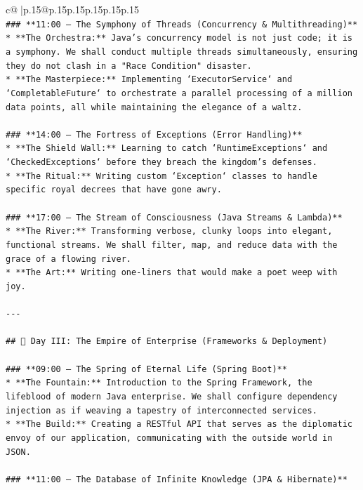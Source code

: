 \documentclass{article}
\begin{document}
{\begin{supertabular}{c@{$\;$}|p{.15\linewidth}@{}p{.15\linewidth}p{.15\linewidth}p{.15\linewidth}p{.15\linewidth}p{.15\linewidth}}
{{{\\ 
\texttt{\#\#\# **11:00 – The Symphony of Threads (Concurrency \& Multithreading)**} \\
\texttt{*   **The Orchestra:** Java's concurrency model is not just code; it is a symphony. We shall conduct multiple threads simultaneously, ensuring they do not clash in a "Race Condition" disaster.} \\
\texttt{*   **The Masterpiece:** Implementing `ExecutorService` and `CompletableFuture` to orchestrate a parallel processing of a million data points, all while maintaining the elegance of a waltz.} \\
\\ 
\texttt{\#\#\# **14:00 – The Fortress of Exceptions (Error Handling)**} \\
\texttt{*   **The Shield Wall:** Learning to catch `RuntimeExceptions` and `CheckedExceptions` before they breach the kingdom's defenses.} \\
\texttt{*   **The Ritual:** Writing custom `Exception` classes to handle specific royal decrees that have gone awry.} \\
\\ 
\texttt{\#\#\# **17:00 – The Stream of Consciousness (Java Streams \& Lambda)**} \\
\texttt{*   **The River:** Transforming verbose, clunky loops into elegant, functional streams. We shall filter, map, and reduce data with the grace of a flowing river.} \\
\texttt{*   **The Art:** Writing one{-}liners that would make a poet weep with joy.} \\
\\ 
\texttt{{-}{-}{-}} \\
\\ 
\texttt{\#\# 🌌 Day III: The Empire of Enterprise (Frameworks \& Deployment)} \\
\\ 
\texttt{\#\#\# **09:00 – The Spring of Eternal Life (Spring Boot)**} \\
\texttt{*   **The Fountain:** Introduction to the Spring Framework, the lifeblood of modern Java enterprise. We shall configure dependency injection as if weaving a tapestry of interconnected services.} \\
\texttt{*   **The Build:** Creating a RESTful API that serves as the diplomatic envoy of our application, communicating with the outside world in JSON.} \\
\\ 
\texttt{\#\#\# **11:00 – The Database of Infinite Knowledge (JPA \& Hibernate)**} \\
}}}
\end{supertabular}}
\end{document}
